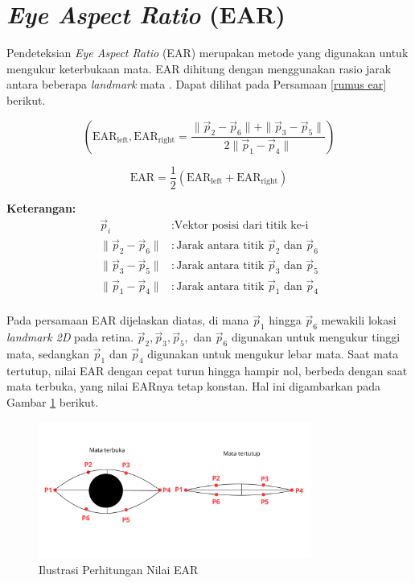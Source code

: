 \section{\textit{Eye Aspect Ratio} (EAR)}

    Pendeteksian \textit{Eye Aspect Ratio }(EAR) merupakan metode yang digunakan untuk mengukur keterbukaan mata. EAR dihitung dengan menggunakan rasio jarak antara beberapa \textit{landmark} mata \cite{electronics11193183}. Dapat dilihat pada Persamaan \ref{rumus ear} berikut.

    
    \begin{equation}
    \label{rumus ear}
    (\text{EAR}_{\text{left}}, \text{EAR}_{\text{right}}   = \frac{{\| \vec{p}_2 - \vec{p}_6 \| + \| \vec{p}_3 - \vec{p}_5 \|}}{{2 \| \vec{p}_1 - \vec{p}_4 \|}})
    \end{equation}

    \begin{equation}
    \text{EAR} = \frac{1}{2}(\text{EAR}_{\text{left}} + \text{EAR}_{\text{right}})
    \end{equation}


    \textbf{Keterangan:}
    \begin{align*}
        \vec{p}_i & : \text{Vektor posisi dari titik ke-i} \\
        \|\vec{p}_2 - \vec{p}_6\| & : \text{Jarak antara titik } \vec{p}_2 \text{ dan } \vec{p}_6 \\
        \|\vec{p}_3 - \vec{p}_5\| & : \text{Jarak antara titik } \vec{p}_3 \text{ dan } \vec{p}_5 \\
        \|\vec{p}_1 - \vec{p}_4\| & : \text{Jarak antara titik } \vec{p}_1 \text{ dan } \vec{p}_4 \\
    \end{align*}
    

    Pada persamaan EAR dijelaskan diatas, di mana $\vec{p}_1$ hingga $\vec{p}_6$ mewakili lokasi
     \textit{landmark 2D} pada retina. $\vec{p}_2, \vec{p}_3, \vec{p}_5,$ dan $\vec{p}_6$ digunakan 
     untuk mengukur tinggi mata, sedangkan $\vec{p}_1$ dan $\vec{p}_4$ digunakan untuk mengukur lebar mata. 
     Saat mata tertutup, nilai EAR dengan cepat turun hingga hampir nol, berbeda dengan saat mata terbuka, 
     yang nilai EARnya tetap konstan. Hal ini digambarkan pada Gambar \ref{Ilustrasi Perhitungan Nilai EAR} berikut.

    \begin{figure}[H]
      \centering
      \includegraphics[width=0.8\textwidth]{figures/bab2/EAR.png}
      \caption[Ilustrasi Perhitungan Nilai EAR]{Ilustrasi Perhitungan Nilai EAR}
      \label{Ilustrasi Perhitungan Nilai EAR}
    \end{figure}
    
